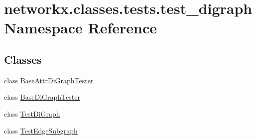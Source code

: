 \hypertarget{namespacenetworkx_1_1classes_1_1tests_1_1test__digraph}{}\section{networkx.\+classes.\+tests.\+test\+\_\+digraph Namespace Reference}
\label{namespacenetworkx_1_1classes_1_1tests_1_1test__digraph}
\subsection*{Classes}
\begin{DoxyCompactItemize}
\item 
class \hyperlink{classnetworkx_1_1classes_1_1tests_1_1test__digraph_1_1BaseAttrDiGraphTester}{Base\+Attr\+Di\+Graph\+Tester}
\item 
class \hyperlink{classnetworkx_1_1classes_1_1tests_1_1test__digraph_1_1BaseDiGraphTester}{Base\+Di\+Graph\+Tester}
\item 
class \hyperlink{classnetworkx_1_1classes_1_1tests_1_1test__digraph_1_1TestDiGraph}{Test\+Di\+Graph}
\item 
class \hyperlink{classnetworkx_1_1classes_1_1tests_1_1test__digraph_1_1TestEdgeSubgraph}{Test\+Edge\+Subgraph}
\end{DoxyCompactItemize}
